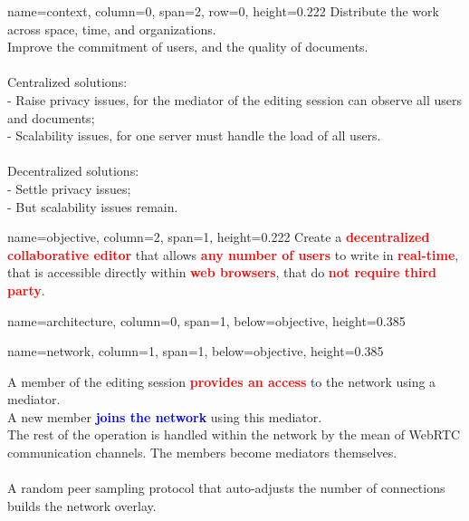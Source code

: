 \documentclass[a1paper, fontscale=0.38, portrait]{baposter}
\newcommand{\RED}[1]{\textcolor{red}{\textbf{#1}}}
\newcommand{\BLUE}[1]{\textcolor{blue}{\textbf{#1}}}
\newcommand{\FIRSTROW}{0.222}
\newcommand{\SECONDROW}{0.385}
\begin{document}
\begin{poster}
  {name=context, column=0, span=2, row=0, height=\FIRSTROW} {
    Distribute the work across space, time, and organizations.\\
    Improve the commitment of users, and the quality of documents.\\
    \\
    Centralized solutions: \\
    - Raise privacy issues, for the mediator of the editing session can
      observe all users and documents; \\
    - Scalability issues, for one server must handle the load of all users. \\
    \\
    Decentralized solutions: \\
    - Settle privacy issues; \\
    - But scalability issues remain.
  }

  
  {name=objective, column=2, span=1, height=\FIRSTROW} {%
    Create a \RED{decentralized collaborative editor} that allows \RED{any number
      of users} to write in \RED{real-time}, that is accessible directly within
    \RED{web browsers}, that do \RED{not require third party}.
  }

  {name=architecture, column=0, span=1, below=objective, height=\SECONDROW}{
    \begin{center}
      
    \end{center}
  }
  
  {name=network, column=1, span=1, below=objective, height=\SECONDROW}{
    \begin{center}
            
    \end{center}
    A member of the editing session \RED{provides an access} to the network using
    a mediator. \\
    A new member \BLUE{joins the network} using this mediator. \\
    The rest of the operation is handled within the network by the mean of
    WebRTC communication channels. The members become mediators themselves.\\
    \\
    A random peer sampling protocol that auto-adjusts the number of connections
    builds the network overlay.

}
\end{poster}
\end{document}
